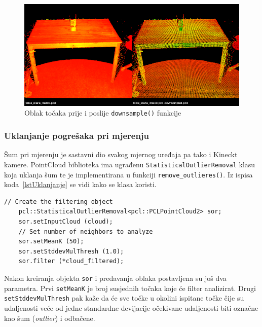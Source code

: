 \begin{figure}[h]
\centering
\includegraphics[scale=0.5]{figures/tablescene-downsampling-example.png}
\caption{Oblak točaka prije i poslije \texttt{downsample()} funkcije}
\label{fig:{tablescene.png}}
\end{figure}


\subsubsection{Uklanjanje pogrešaka pri mjerenju} %
\label{ssub:Uklanjanje pogrešaka pri mjerenju}
Šum pri mjerenju je sastavni dio svakog mjernog uređaja pa tako i
Kineckt kamere. PointCloud biblioteka ima ugrađenu
\texttt{StatisticalOutlierRemoval} klasu koja uklanja šum te je
implementirana u funkciji \texttt{remove\_outlieres()}.
Iz ispisa koda~\ref{lstUklanjanje} se vidi kako se klasa koristi.

\begin{minipage}{\textwidth}
\begin{lstlisting}[label=lstUklanjanje, caption={Dio izvornog koda 
iz funkcije \texttt{remove\_outliers()} }]
    // Create the filtering object
    pcl::StatisticalOutlierRemoval<pcl::PCLPointCloud2> sor;
    sor.setInputCloud (cloud);
    // Set number of neighbors to analyze
    sor.setMeanK (50);
    sor.setStddevMulThresh (1.0);
    sor.filter (*cloud_filtered);
\end{lstlisting}
\end{minipage}

Nakon kreiranja objekta \texttt{sor} i predavanja oblaka postavljena su
još dva parametra. Prvi \texttt{setMeanK} je broj susjednih točaka koje
će filter analizirat. Drugi \texttt{setStddevMulThresh} pak kaže da će
sve točke u okolini ispitane točke čije su udaljenosti veće od jedne
standardne devijacije očekivane udaljenosti biti označne kao šum
(\textit{outlier}) i odbačene.

